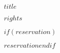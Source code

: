 
  \thispagestyle{empty}
  \vspace*{\fill}

  \par\noindent\emph{$title$}\newline
  \par\noindent\emph{$rights$}\newline

  \footnotesize
  $if(reservation)$\par\noindent $reservation$\newline$endif$


